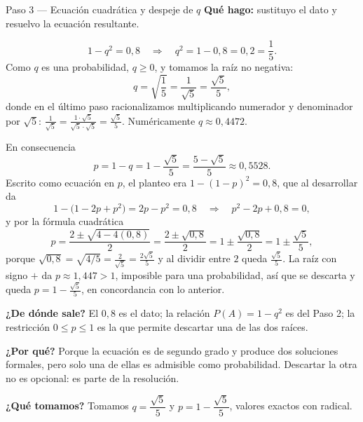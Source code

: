 \documentclass[11pt]{article}
\begin{document}
\begin{paso}{Paso 3 --- Ecuación cuadrática y despeje de $q$}
\textbf{Qué hago:} sustituyo el dato y resuelvo la ecuación resultante.

\[
1-q^{2}=0{,}8
\quad\Longrightarrow\quad
q^{2}=1-0{,}8=0{,}2=\frac{1}{5}.
\]
Como $q$ es una probabilidad, $q\geq 0$, y tomamos la raíz no negativa:
\[
q=\sqrt{\frac{1}{5}}=\frac{1}{\sqrt{5}}=\frac{\sqrt{5}}{5},
\]
donde en el último paso racionalizamos multiplicando numerador y denominador por $\sqrt5$:
$\tfrac{1}{\sqrt5}=\tfrac{1\cdot\sqrt5}{\sqrt5\cdot\sqrt5}=\tfrac{\sqrt5}{5}$. Numéricamente $q\approx 0{,}4472$.

En consecuencia
\[
p=1-q=1-\frac{\sqrt{5}}{5}=\frac{5-\sqrt{5}}{5}\approx 0{,}5528 .
\]
Escrito como ecuación en $p$, el planteo era $1-(1-p)^{2}=0{,}8$, que al desarrollar da
\[
1-\bigl(1-2p+p^{2}\bigr)=2p-p^{2}=0{,}8
\quad\Longrightarrow\quad
p^{2}-2p+0{,}8=0,
\]
y por la fórmula cuadrática
\[
p=\frac{2\pm\sqrt{4-4(0{,}8)}}{2}=\frac{2\pm\sqrt{0{,}8}}{2}=1\pm\frac{\sqrt{0{,}8}}{2}=1\pm\frac{\sqrt{5}}{5},
\]
porque $\sqrt{0{,}8}=\sqrt{4/5}=\tfrac{2}{\sqrt5}=\tfrac{2\sqrt5}{5}$ y al dividir entre $2$ queda $\tfrac{\sqrt5}{5}$. La raíz con signo $+$ da $p\approx 1{,}447>1$, imposible para una probabilidad, así que se descarta y queda $p=1-\tfrac{\sqrt5}{5}$, en concordancia con lo anterior.

\textbf{¿De dónde sale?} El $0{,}8$ es el dato; la relación $P(A)=1-q^{2}$ es del Paso 2; la restricción $0\leq p\leq 1$ es la que permite descartar una de las dos raíces.

\textbf{¿Por qué?} Porque la ecuación es de segundo grado y produce dos soluciones formales, pero solo una de ellas es admisible como probabilidad. Descartar la otra no es opcional: es parte de la resolución.

\textbf{¿Qué tomamos?} Tomamos $q=\dfrac{\sqrt5}{5}$ y $p=1-\dfrac{\sqrt5}{5}$, valores exactos con radical.
\end{paso}
\end{document}
